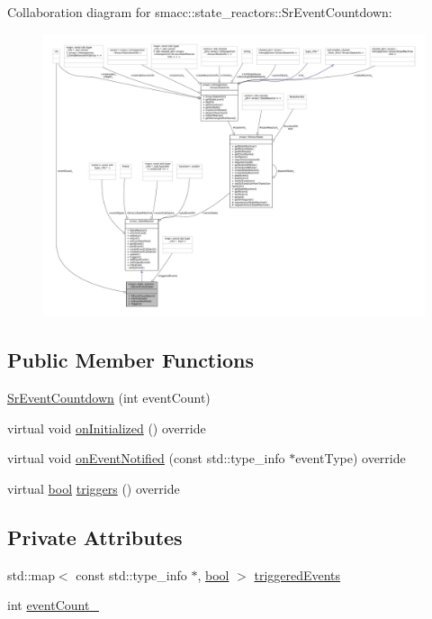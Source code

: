 Collaboration diagram for smacc\+:\+:state\+\_\+reactors\+:\+:Sr\+Event\+Countdown\+:
\nopagebreak
\begin{figure}[H]
\begin{center}
\leavevmode
\includegraphics[width=350pt]{classsmacc_1_1state__reactors_1_1SrEventCountdown__coll__graph}
\end{center}
\end{figure}
\subsection*{Public Member Functions}
\begin{DoxyCompactItemize}
\item 
\hyperlink{classsmacc_1_1state__reactors_1_1SrEventCountdown_abc814e91ad26a46ee5d91e2f19b639b1}{Sr\+Event\+Countdown} (int event\+Count)
\item 
virtual void \hyperlink{classsmacc_1_1state__reactors_1_1SrEventCountdown_a1bd7afbf283ade29f9305f0c3a64ef94}{on\+Initialized} () override
\item 
virtual void \hyperlink{classsmacc_1_1state__reactors_1_1SrEventCountdown_a6cc15cf6633bd882ac40a87d698b3b6b}{on\+Event\+Notified} (const std\+::type\+\_\+info $\ast$event\+Type) override
\item 
virtual \hyperlink{classbool}{bool} \hyperlink{classsmacc_1_1state__reactors_1_1SrEventCountdown_aff678113dbd07339e5e3736e4aa00c81}{triggers} () override
\end{DoxyCompactItemize}
\subsection*{Private Attributes}
\begin{DoxyCompactItemize}
\item 
std\+::map$<$ const std\+::type\+\_\+info $\ast$, \hyperlink{classbool}{bool} $>$ \hyperlink{classsmacc_1_1state__reactors_1_1SrEventCountdown_a6f9b3a51e8e8becbf76f99a5d0bcb8c5}{triggered\+Events}
\item 
int \hyperlink{classsmacc_1_1state__reactors_1_1SrEventCountdown_aa3b1de656f3d3cadadc47f00c4e0be86}{event\+Count\+\_\+}
\end{DoxyCompactItemize}
